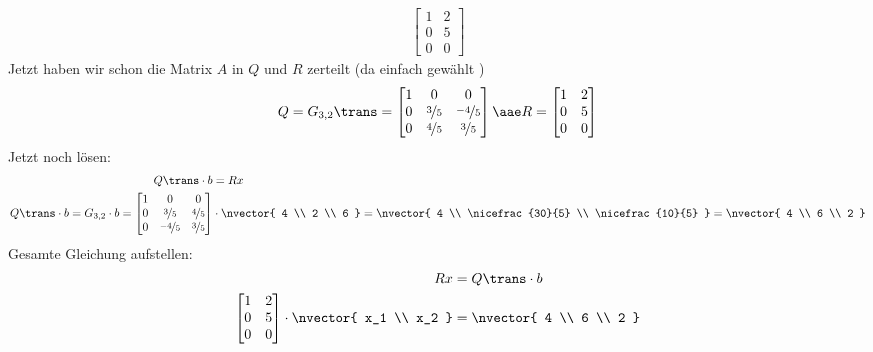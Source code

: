{\begin{align*}
			\begin{bmatrix}
				1 & 2 \\
				0 & 5 \\
				0 & 0
			\end{bmatrix}
		\end{align*}
		Jetzt haben wir schon die Matrix $A$ in $Q$ und $R$ zerteilt (da einfach gewählt \Laughey)
		\begin{align*}
			Q = G_{3,2}\trans = 
			\begin{bmatrix}
				1 & 0 & 0\\
				0 & \nicefrac{3}{5} & \nicefrac{-4}{5}\\
				0 & \nicefrac{4}{5} & \nicefrac{3}{5}
			\end{bmatrix} 
			\aae R = 
			\begin{bmatrix}
				1 & 2 \\
				0 & 5 \\
				0 & 0 
			\end{bmatrix}
		\end{align*}
		\n 
		Jetzt noch lösen:
		\begin{align*}
			Q\trans \cdot b &= Rx \\
			Q\trans \cdot b = 
			G_{3,2} \cdot b = 
			\begin{bmatrix}
				1 & 0 & 0\\
				0 & \nicefrac{3}{5} & \nicefrac{4}{5}\\
				0 & \nicefrac{-4}{5} & \nicefrac{3}{5}
			\end{bmatrix} &\cdot 
			\nvector{
				4 \\ 2 \\ 6
			} = 
			\nvector{
				4 \\ \nicefrac{30}{5} \\ \nicefrac{10}{5}
			} = 
			\nvector{
			4 \\ 6 \\ 2
			}
		\end{align*}
		Gesamte Gleichung aufstellen:
		\begin{align*}
 			Rx &= Q\trans \cdot b\\
			\begin{bmatrix}
				1 & 2 \\
				0 & 5 \\
				0 & 0 \\
			\end{bmatrix} \cdot 
			\nvector{
				x_1 \\ x_2
			} &= 
			\nvector{
				4 \\ 6 \\ 2
}
\end{align*}}
